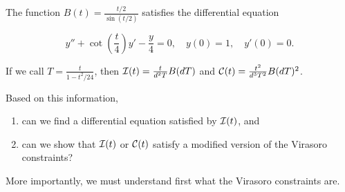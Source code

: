 \documentclass[12pt]{memoir}
\begin{document}
The function \(B(t)=\frac{t/2}{\sin(t/2)}\) satisfies the differential equation 

\[
y''+\cot\left(\frac{t}{4}\right)y'-\frac{y}{4}=0,\quad y(0)=1,\quad y'(0)=0.
\]

If we call \(T=\frac{t}{1-t^2/24}\), then \(\mathcal{I}(t)=\frac{t}{d^2T}B(dT)\) and \(\mathcal{C}(t)=\frac{t^2}{d^3T^2}B(dT)^2\).

\begin{Qn}
    Based on this information,
    \begin{enumerate}
        \item can we find a differential equation satisfied by \(\mathcal{I}(t)\), and
        \item can we show that \(\mathcal{I}(t)\) or \(\mathcal{C}(t)\) satisfy a modified version of the Virasoro constraints?
    \end{enumerate}
    More importantly, we must understand first what the Virasoro constraints are.
\end{Qn}
\end{document}
